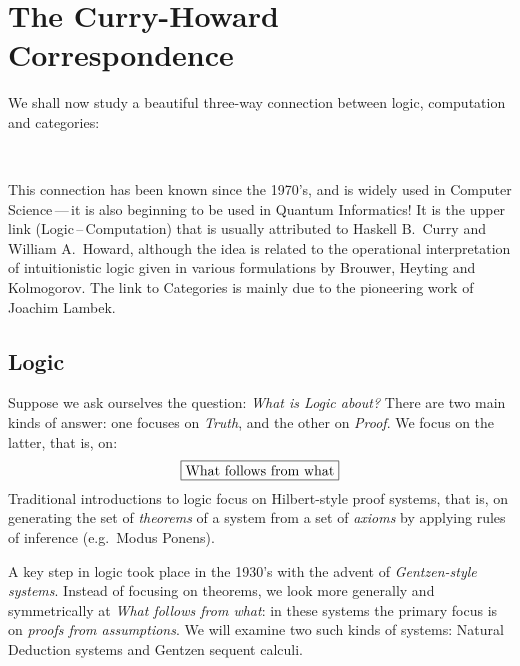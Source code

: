 \documentclass[12pt]{article}
\begin{document}
\section{The Curry-Howard Correspondence}
We shall now study a beautiful three-way connection between logic, computation and categories:
\begin{center}
 \hspace{30mm}%
 \\[10mm]
\hspace{13mm} %
\end{center}
%
This connection has been known since the 1970's, and is widely used in Computer Science\,---\,it is also beginning to be used in Quantum Informatics!
It is the upper link (Logic\,--\,Computation) that is usually attributed to Haskell B.~Curry and William A.~Howard, although the idea is related to  the  operational interpretation of intuitionistic logic  given in various formulations by Brouwer, Heyting and Kolmogorov. The link to Categories is mainly due to the pioneering
work of Joachim Lambek.

\subsection{Logic}
Suppose we ask ourselves the question: \emph{What is Logic about?} There are  two main kinds of answer:  one focuses on \emph{Truth}, and the other
on \emph{Proof}. We focus on the latter, that is, on:
\[ \fbox{What follows from what} \]
%
Traditional introductions to logic focus on Hilbert-style proof systems, that is, on generating the set of \emph{theorems} of a system from a set of
\emph{axioms} by applying rules of inference (e.g.~Modus Ponens).

A key step in logic took place in the 1930's with the advent of \emph{Gentzen-style systems}. Instead of focusing on theorems, we look more generally
and symmetrically at \emph{What follows from what}: in these systems the primary focus is on \emph{proofs from assumptions}.
We will examine two such kinds of systems: Natural Deduction systems and Gentzen sequent calculi.
\end{document}
